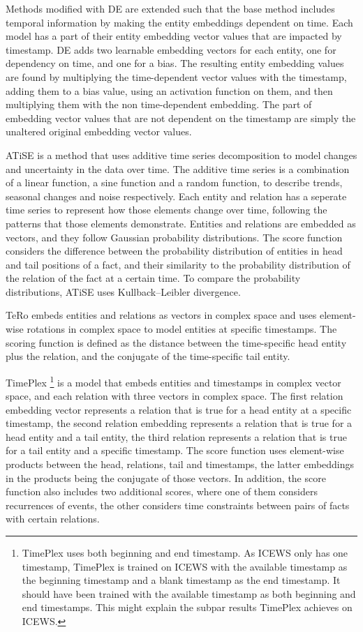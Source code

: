 Methods modified with DE \cite{goel19diachronicemb} are extended such that the base method includes temporal information by making the entity embeddings dependent on time.
Each model has a part of their entity embedding vector values that are impacted by timestamp.
DE adds two learnable embedding vectors for each entity, one for dependency on time, and one for a bias.
The resulting entity embedding values are found by multiplying the time-dependent vector values with the timestamp, adding them to a bias value, using an activation function on them, and then multiplying them with the non time-dependent embedding. 
The part of embedding vector values that are not dependent on the timestamp are simply the unaltered original embedding vector values.

ATiSE \cite{xu19atise} is a method that uses additive time series decomposition to model changes and uncertainty in the data over time. The additive time series is a combination of a linear function, a sine function and a random function, to describe trends, seasonal changes and noise respectively. Each entity and relation has a seperate time series to represent how those elements change over time, following the patterns that those elements demonstrate. Entities and relations are embedded as vectors, and they follow Gaussian probability distributions. The score function considers the difference between the probability distribution of entities in head and tail positions of a fact, and their similarity to the probability distribution of the relation of the fact at a certain time. To compare the probability distributions, ATiSE uses Kullback–Leibler divergence.

TeRo \cite{xu2020tero} embeds entities and relations as vectors in complex space and uses element-wise rotations in complex space to model entities at specific timestamps.
The scoring function is defined as the distance between the time-specific head entity plus the relation, and the conjugate of the time-specific tail entity.

TimePlex%
\footnote{TimePlex uses both beginning and end timestamp. As ICEWS only has one timestamp, TimePlex is trained on ICEWS with the available timestamp as the beginning timestamp and a blank timestamp as the end timestamp. It should have been trained with the available timestamp as both beginning and end timestamps. This might explain the subpar results TimePlex achieves on ICEWS.}
\cite{jain2020timeplex} is a model that embeds entities and timestamps in complex vector space, and each relation with three vectors in complex space. The first relation embedding vector represents a relation that is true for a head entity at a specific timestamp, the second relation embedding represents a relation that is true for a head entity and a tail entity, the third relation represents a relation that is true for a tail entity and a specific timestamp. The score function uses element-wise products between the head, relations, tail and timestamps, the latter embeddings in the products being the conjugate of those vectors. In addition, the score function also includes two additional scores, where one of them considers recurrences of events, the other considers time constraints between pairs of facts with certain relations.